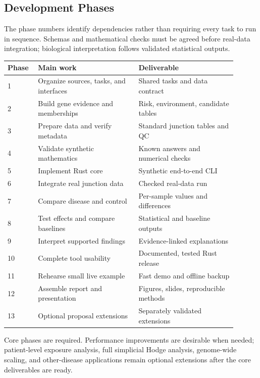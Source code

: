 \subsection{Development Phases}

The phase numbers identify dependencies rather than requiring every task to run
in sequence. Schemas and mathematical checks must be agreed before real-data
integration; biological interpretation follows validated statistical outputs.

\begin{center}
\small
\begin{tabular}{@{}p{0.11\linewidth}p{0.40\linewidth}p{0.39\linewidth}@{}}
\hline
Phase & Main work & Deliverable \\
\hline
1 & Organize sources, tasks, and interfaces & Shared tasks and data contract \\
2 & Build gene evidence and memberships & Risk, environment, candidate tables \\
3 & Prepare data and verify metadata & Standard junction tables and QC \\
4 & Validate synthetic mathematics & Known answers and numerical checks \\
5 & Implement Rust core & Synthetic end-to-end CLI \\
6 & Integrate real junction data & Checked real-data run \\
7 & Compare disease and control & Per-sample values and differences \\
8 & Test effects and compare baselines & Statistical and baseline outputs \\
9 & Interpret supported findings & Evidence-linked explanations \\
10 & Complete tool usability & Documented, tested Rust release \\
11 & Rehearse small live example & Fast demo and offline backup \\
12 & Assemble report and presentation & Figures, slides, reproducible methods \\
13 & Optional proposal extensions & Separately validated extensions \\
\hline
\end{tabular}
\end{center}

Core phases are required. Performance improvements are desirable when needed;
patient-level exposure analysis, full simplicial Hodge analysis, genome-wide
scaling, and other-disease applications remain optional extensions after the
core deliverables are ready.

